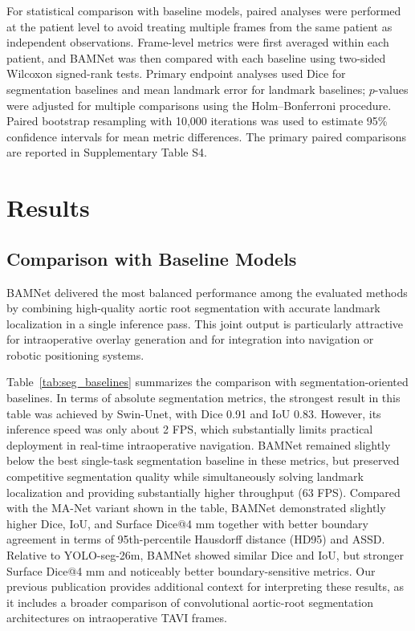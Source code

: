 \documentclass[utf8]{FrontiersinHarvard}
\begin{document}
For statistical comparison with baseline models, paired analyses were performed at the patient level to avoid treating multiple frames 
from the same patient as independent observations. Frame-level metrics were first averaged within each patient, and BAMNet was then compared 
with each baseline using two-sided Wilcoxon signed-rank tests. Primary endpoint analyses used Dice for segmentation baselines and mean landmark 
error for landmark baselines; $p$-values were adjusted for multiple comparisons using the Holm--Bonferroni procedure. Paired bootstrap resampling 
with 10,000 iterations was used to estimate 95\% confidence intervals for mean metric differences. The primary paired comparisons are reported in 
Supplementary Table S4.


\section{Results}

\subsection{Comparison with Baseline Models}
\label{subsec:baseline_results}

BAMNet delivered the most balanced performance among the evaluated methods by combining high-quality aortic root segmentation with accurate 
landmark localization in a single inference pass. This joint output is particularly attractive for intraoperative overlay generation and for 
integration into navigation or robotic positioning systems.

Table~\ref{tab:seg_baselines} summarizes the comparison with segmentation-oriented baselines. In terms of absolute segmentation metrics, the 
strongest result in this table was achieved by Swin-Unet, with Dice 0.91 and IoU 0.83. However, its inference speed was only about 2 FPS, 
which substantially limits practical deployment in real-time intraoperative navigation. BAMNet remained slightly below the best single-task 
segmentation baseline in these metrics, but preserved competitive segmentation quality while simultaneously solving landmark localization and 
providing substantially higher throughput (63 FPS). Compared with the MA-Net variant shown in the table, BAMNet demonstrated slightly higher Dice, 
IoU, and Surface Dice@4 mm together with better boundary agreement in terms of 95th-percentile Hausdorff distance (HD95) and ASSD. Relative to 
YOLO-seg-26m, BAMNet showed similar Dice and IoU, but stronger Surface Dice@4 mm and noticeably better boundary-sensitive metrics. Our previous 
publication \citep{laptev2025_aorticroot} provides additional context for interpreting these results, as it includes a broader comparison of 
convolutional aortic-root segmentation architectures on intraoperative TAVI frames.
\end{document}

